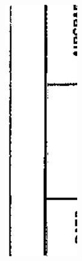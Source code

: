 \documentclass[10pt]{article}
\begin{document}
\includegraphics[max width=\textwidth, center]{2025_02_27_dd68c3d38de88f0516d9g-015}\\
\end{document}
